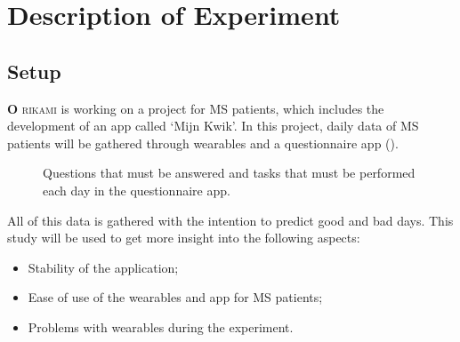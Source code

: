 
\chapter{Description of Experiment}\label{chapter: Description of Experiment}
\section{Setup}
\lettrine[lhang = 0.4, findent=-60pt, lines=7]{\textbf{
		\initfamily \fontsize{40mm}{40mm} \selectfont O
		\normalfont}}{rikami}
is working on a project for MS patients, which includes the development of an app called `Mijn Kwik'.
In this project, daily data of MS patients will be gathered through wearables and a questionnaire app ().
%
\begin{figure}
	\centering
	\hspace{2cm}
	\vfill
	\hspace{2cm}	
	
	\caption{Questions that must be answered and tasks that must be performed each day in the questionnaire app.}
	\label{fig:app}
\end{figure}
%
All of this data is gathered with the intention to predict good and bad days.
This study will be used to get more insight into the following aspects:
%
\begin{itemize}
	\item Stability of the application;
	\item Ease of use of the wearables and app for MS patients; 
	\item Problems with wearables during the experiment.
\end{itemize}
